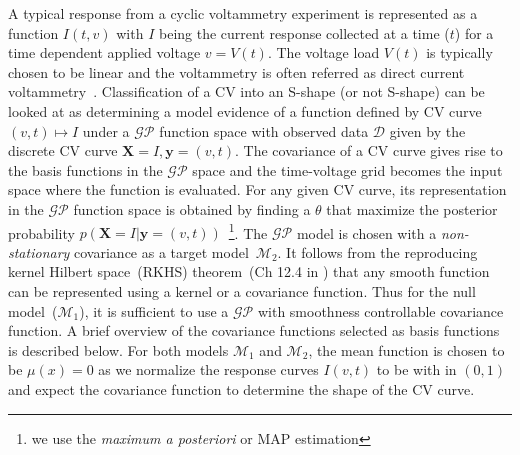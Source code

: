 A typical response from a cyclic voltammetry experiment is represented as a function \(I(t,v)\) with \(I\) being the current response collected at a time (\(t\)) for a time dependent applied voltage \(v=V(t)\). 
The voltage load \(V(t)\) is typically chosen to be linear and the voltammetry is often referred as direct current voltammetry~\cite{li2019application}.
Classification of a CV into an S-shape (or not S-shape) can be looked at as determining a model evidence of a function defined by CV curve \( (v,t) \mapsto I\) under a \(\mathcal{GP}\) function space with observed data \(\mathcal{D}\) given by the discrete CV curve \(\textbf{X} = I, \textbf{y}=(v,t)\). 
The covariance of a CV curve gives rise to the basis functions in the \(\mathcal{GP}\) space and the time-voltage grid becomes the input space where the function is evaluated.
For any given CV curve, its representation in the \(\mathcal{GP}\) function space  is obtained by finding a \(\theta\) that maximize the posterior probability \(p(\textbf{X} = I|\textbf{y}=(v,t))\)~\footnote{we use the \textit{maximum a posteriori} or MAP estimation}.
The \(\mathcal{GP}\) model is chosen with a \textit{non-stationary} covariance as a target model~\(\mathcal{M}_2\). 
It follows from the reproducing kernel Hilbert space~(RKHS) theorem~(Ch 12.4 in \cite{mathML}) that any smooth function can be represented using a kernel or a covariance function.
Thus for the null model~(\(\mathcal{M}_1\)), it is sufficient to use a \(\mathcal{GP}\) with smoothness controllable covariance function. 
A brief overview of the covariance functions selected as basis functions is described below.
For both models \(\mathcal{M}_1\) and \(\mathcal{M}_2\), the mean function is chosen to be \(\mu(x)=0 \) as we normalize the response curves \(I(v,t)\) to be with in \((0,1)\) and expect the covariance function to determine the shape of the CV curve. 

